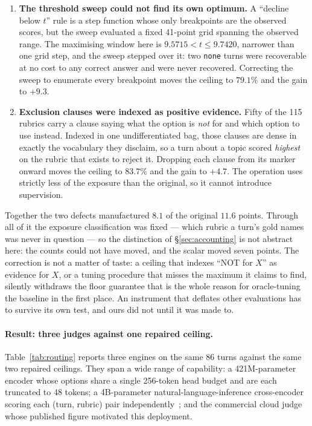 \documentclass[10pt,twocolumn]{article}
\begin{document}
\begin{enumerate}[topsep=2pt,itemsep=2pt,leftmargin=1.6em]
\item \textbf{The threshold sweep could not find its own optimum.} A ``decline below $t$'' rule is a step function whose only breakpoints are the observed scores, but the sweep evaluated a fixed 41-point grid spanning the observed range. The maximising window here is $9.5715 < t \leq 9.7420$, narrower than one grid step, and the sweep stepped over it: two \texttt{none} turns were recoverable at no cost to any correct answer and were never recovered. Correcting the sweep to enumerate every breakpoint moves the ceiling to $79.1\%$ and the gain to $+9.3$.
\item \textbf{Exclusion clauses were indexed as positive evidence.} Fifty of the 115 rubrics carry a clause saying what the option is \emph{not} for and which option to use instead. Indexed in one undifferentiated bag, those clauses are dense in exactly the vocabulary they disclaim, so a turn about a topic scored \emph{highest} on the rubric that exists to reject it. Dropping each clause from its marker onward moves the ceiling to $83.7\%$ and the gain to $+4.7$. The operation uses strictly less of the exposure than the original, so it cannot introduce supervision.
\end{enumerate}

Together the two defects manufactured $8.1$ of the original $11.6$ points. Through all of it the exposure classification was fixed --- which rubric a turn's gold names was never in question --- so the distinction of \S\ref{sec:accounting} is not abstract here: the counts could not have moved, and the scalar moved seven points. The correction is not a matter of taste: a ceiling that indexes ``NOT for $X$'' as evidence for $X$, or a tuning procedure that misses the maximum it claims to find, silently withdraws the floor guarantee that is the whole reason for oracle-tuning the baseline in the first place. An instrument that deflates other evaluations has to survive its own test, and ours did not until it was made to.

\paragraph{Result: three judges against one repaired ceiling.} Table~\ref{tab:routing} reports three engines on the same 86 turns against the same two repaired ceilings. They span a wide range of capability: a 421M-parameter encoder whose options share a single 256-token head budget and are each truncated to 48 tokens; a 4B-parameter natural-language-inference cross-encoder scoring each (turn, rubric) pair independently~\cite{openjev2026}; and the commercial cloud judge whose published figure motivated this deployment.
\end{document}
